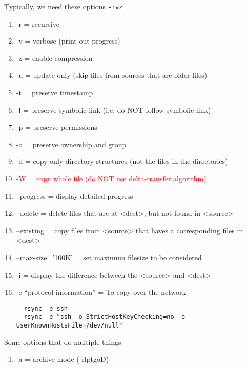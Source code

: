 Typically, we need these options \verb!-rvz!
\begin{enumerate} 
  \item -r = recursive
  \item -v = verbose (print out progress)
  \item -z = enable compression
  \item -u = update only (skip files from sources that are older files)
  \item -t = preserve timestamp
  \item -l = preserve symbolic link (i.e. do NOT follow symbolic link)
  \item -p = preserve permissions
  \item -o = preserve ownership and group
  \item -d = copy only directory structures (not the files in the directories)
  \item \textcolor{red}{-W = copy whole file (do NOT use delta-transfer
  algorithm)}
  \item --progress = display detailed progress
  \item --delete = delete files that are at <dest>, but not found in <source>
  \item --existing = copy files from <source> that haves a corresponding files
  in <dest>
  \item --max-size='100K' = set maximum filesize to be considered
  \item -i = display the difference between the <source> and <dest>
  \item -e ``protocol information'' = To copy over the network

{\tiny
  \begin{verbatim}
  rsync -e ssh
  rsync -e "ssh -o StrictHostKeyChecking=no -o  UserKnownHostsFile=/dev/null"
  \end{verbatim}
}
\end{enumerate}

Some options that do multiple things
\begin{enumerate}
  \item -a = archive mode (-rlptgoD)
\end{enumerate}


